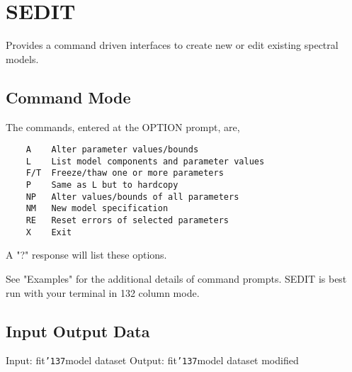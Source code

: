 \documentclass{book}
\renewcommand{\_}{{\tt\char'137}}     %
\begin{document}
\section{SEDIT}
Provides a command driven interfaces to create new or edit existing
spectral models.

\subsection{Command Mode}
The commands, entered at the OPTION prompt, are,

\begin{verbatim}
    A    Alter parameter values/bounds
    L    List model components and parameter values
    F/T  Freeze/thaw one or more parameters
    P    Same as L but to hardcopy
    NP   Alter values/bounds of all parameters
    NM   New model specification
    RE   Reset errors of selected parameters
    X    Exit
\end{verbatim}
A "?" response will list these options.

See "Examples" for the additional details of command prompts. SEDIT
is best run with your terminal in 132 column mode.

\subsection{Input Output Data}
Input: fit\_model dataset
Output: fit\_model dataset modified
\end{document}
